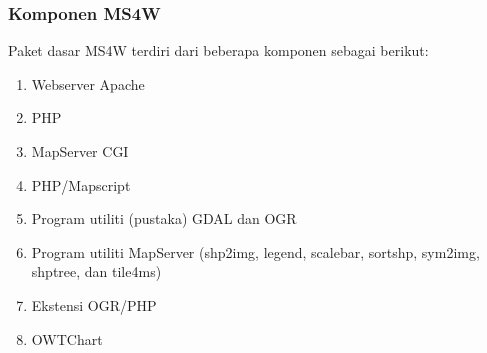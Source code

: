 \subsubsection{Komponen MS4W}
Paket dasar MS4W terdiri dari beberapa komponen sebagai berikut:
\begin{enumerate}
\item Webserver Apache
\item PHP
\item MapServer CGI
\item PHP/Mapscript
\item Program utiliti (pustaka) GDAL dan OGR
\item Program utiliti MapServer (shp2img, legend, scalebar, sortshp, sym2img, shptree, dan tile4ms)
\item Ekstensi OGR/PHP
\item OWTChart
\end{enumerate}

